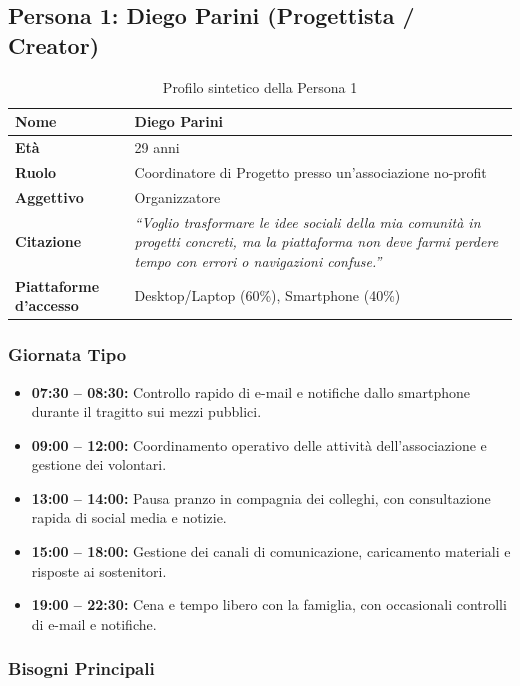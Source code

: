 \documentclass[11pt,a4paper]{article}
\begin{document}
\subsection{Persona 1: Diego Parini (Progettista / Creator)}
\label{subsec:persona1}

\begin{table}[h!]
\centering
\small
\begin{tabular}{|p{3.5cm}|p{11.5cm}|}
\hline
\textbf{Nome} & Diego Parini \\ \hline
\textbf{Età} & 29 anni \\ \hline
\textbf{Ruolo} & Coordinatore di Progetto presso un'associazione no-profit \\ \hline
\textbf{Aggettivo} & Organizzatore \\ \hline
\textbf{Citazione} & \textit{``Voglio trasformare le idee sociali della mia comunità in progetti concreti, ma la piattaforma non deve farmi perdere tempo con errori o navigazioni confuse.''} \\ \hline
\textbf{Piattaforme d'accesso} & Desktop/Laptop (60\%), Smartphone (40\%) \\ \hline
\end{tabular}
\caption{Profilo sintetico della Persona 1}
\label{tab:persona1}
\end{table}

\subsubsection{Giornata Tipo}
\begin{itemize}
    \item \textbf{07:30 -- 08:30:} Controllo rapido di e-mail e notifiche dallo smartphone durante il tragitto sui mezzi pubblici.
    \item \textbf{09:00 -- 12:00:} Coordinamento operativo delle attività dell'associazione e gestione dei volontari.
    \item \textbf{13:00 -- 14:00:} Pausa pranzo in compagnia dei colleghi, con consultazione rapida di social media e notizie.
    \item \textbf{15:00 -- 18:00:} Gestione dei canali di comunicazione, caricamento materiali e risposte ai sostenitori.
    \item \textbf{19:00 -- 22:30:} Cena e tempo libero con la famiglia, con occasionali controlli di e-mail e notifiche.
\end{itemize}

\subsubsection{Bisogni Principali}
\end{document}
